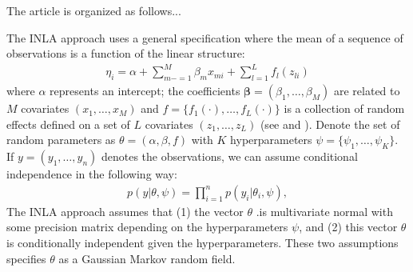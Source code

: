 \documentclass[11pt]{amsart}
\theoremstyle{plain}
\theoremstyle{definition}
\theoremstyle{remark}
\begin{document}
The article is organized as follows...

 
The INLA approach uses a general specification where the mean of a sequence of
observations is a function of the linear structure:
\begin{align}\label{eq:meanINLA}
  \eta_i = \alpha +\sum_{m-=1}^M\beta_mx_{mi}+\sum_{l=1}^Lf_l(z_{li})
\end{align}
where $\alpha$ represents an intercept; the coefficients
$\mathbf{\beta} = (\beta_1,\ldots,\beta_M)$ are related to $M$ covariates
$(x_1,\ldots,x_M)$ and $f = \{f_1(\cdot),\ldots,f_L(\cdot)\}$ is a collection of
random effects defined on a set of $L$ covariates $(z_1,\ldots,z_L)$ (see
\cite{Rue2009} and \cite{Blangiardo2013}). Denote the set of random parameters as
$\theta = (\alpha,\beta,f)$ with $K$ hyperparameters $\psi =
\{\psi_1,\ldots,\psi_K\}$. If $y=(y_1,\ldots,y_n)$ denotes the observations, we
can assume conditional independence in the following way:
\begin{align*}
  p(y|\theta,\psi)=\prod_{i=1}^np(y_i|\theta_i,\psi),
\end{align*}
The INLA approach assumes that (1) the vector $\theta$ .is multivariate normal with
some precision matrix depending on the hyperparameters $\psi$, and (2) this vector
$\theta$ is conditionally independent given the hyperparameters. These two
assumptions specifies $\theta$ as a Gaussian Markov random field.
\end{document}
